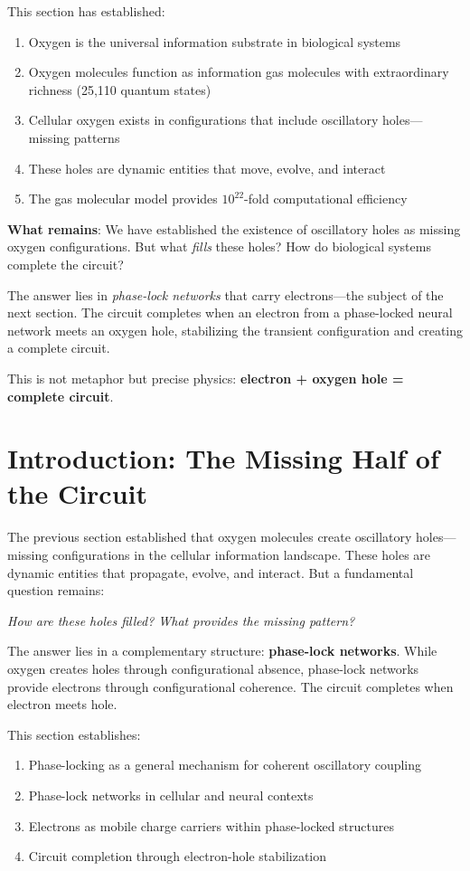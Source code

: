 \documentclass[12pt,a4paper]{article}
\begin{document}
This section has established:
\begin{enumerate}
\item Oxygen is the universal information substrate in biological systems
\item Oxygen molecules function as information gas molecules with extraordinary richness (25,110 quantum states)
\item Cellular oxygen exists in configurations that include oscillatory holes—missing patterns
\item These holes are dynamic entities that move, evolve, and interact
\item The gas molecular model provides $10^{22}$-fold computational efficiency
\end{enumerate}

\textbf{What remains}: We have established the existence of oscillatory holes as missing oxygen configurations. But what \textit{fills} these holes? How do biological systems complete the circuit?

The answer lies in \textit{phase-lock networks} that carry electrons—the subject of the next section. The circuit completes when an electron from a phase-locked neural network meets an oxygen hole, stabilizing the transient configuration and creating a complete circuit.

This is not metaphor but precise physics: \textbf{electron + oxygen hole = complete circuit}.

\section{Introduction: The Missing Half of the Circuit}

The previous section established that oxygen molecules create oscillatory holes—missing configurations in the cellular information landscape. These holes are dynamic entities that propagate, evolve, and interact. But a fundamental question remains:

\textit{How are these holes filled? What provides the missing pattern?}

The answer lies in a complementary structure: \textbf{phase-lock networks}. While oxygen creates holes through configurational absence, phase-lock networks provide electrons through configurational coherence. The circuit completes when electron meets hole.

This section establishes:
\begin{enumerate}
\item Phase-locking as a general mechanism for coherent oscillatory coupling
\item Phase-lock networks in cellular and neural contexts
\item Electrons as mobile charge carriers within phase-locked structures
\item Circuit completion through electron-hole stabilization
\end{enumerate}
\end{document}
